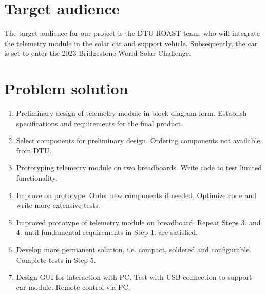 \documentclass[]{article}
\begin{document}
\section{Target audience}
The target audience for our project is the DTU ROAST team, who will integrate the telemetry module in the solar car and support vehicle. Subsequently, the car is set to enter the 2023 Bridgestone World Solar Challenge.

\section{Problem solution}
\begin{enumerate}
    \item Preliminary design of telemetry module in block diagram form. Establish specifications and requirements for the final product. 
    \item Select components for preliminary design. Ordering components not available from DTU. 
    \item Prototyping telemetry module on two breadboards. Write code to test limited functionality. 
    \item Improve on prototype. Order new components if needed. Optimize code and write more extensive tests. 
    \item Improved prototype of telemetry module on breadboard. Repeat Steps 3. and 4. until fundamental requirements in Step 1. are satisfied. 
    \item Develop more permanent solution, i.e. compact, soldered and configurable. Complete tests in Step 5.
    \item Design GUI for interaction with PC. Test with USB connection to support-car module. Remote control via PC. 

\end{enumerate}
\end{document}
